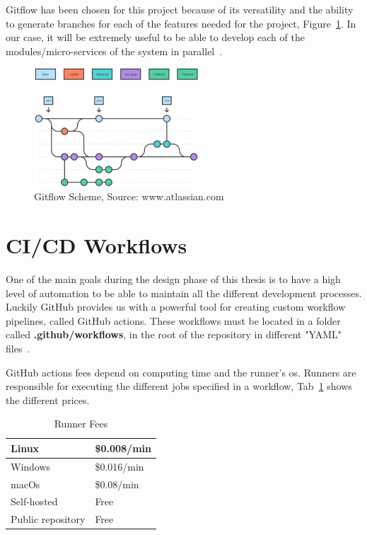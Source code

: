 Gitflow has been chosen for this project because of its versatility and the ability to generate branches for each of the features needed for the project, Figure~\ref{fig:gitflow-example}. In our case, it will be extremely useful to be able to develop each of the modules/micro-services of the system in parallel~\cite{driessen2010successful}.

\begin{figure}[H]
    \centering
    \includegraphics[width=0.55\textwidth]{figures/gitflow.png}
    \caption{Gitflow Scheme, Source: www.atlassian.com}
    \label{fig:gitflow-example}
\end{figure}

\section{CI/CD Workflows}

One of the main goals during the design phase of this thesis is to have a high level of automation to be able to maintain all the different development processes. Luckily GitHub provides us with a powerful tool for creating custom workflow pipelines, called GitHub actions. These workflows must be located in a folder called \textbf{.github/workflows}, in the root of the repository in different "YAML" files~\cite{github2020actions}.

GitHub actions fees depend on computing time and the runner's \gls{os}. Runners are responsible for executing the different jobs specified in a workflow, Tab~\ref{tab:action-fees} shows the different prices.

\begin{table}[h]
\centering
\caption{Runner Fees}
\label{tab:action-fees}
\begin{tabular}{@{}ll@{}}
\toprule
Linux             & \$0.008/min \\ \midrule
Windows           & \$0.016/min \\ \midrule
macOs             & \$0.08/min  \\ \midrule
Self-hosted       & Free        \\ \midrule
Public repository & Free       
\end{tabular}
\end{table}

